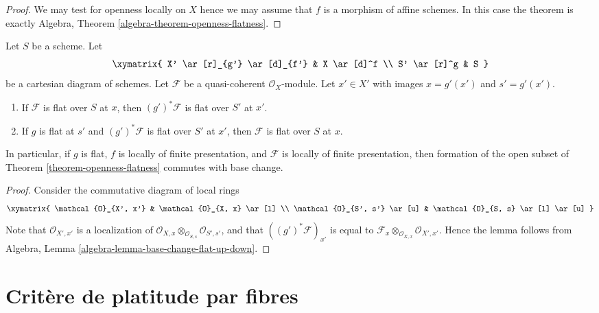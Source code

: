 \begin{proof}
We may test for openness locally on $X$ hence we may assume
that $f$ is a morphism of affine schemes. In this case the
theorem is exactly
Algebra, Theorem \ref{algebra-theorem-openness-flatness}.
\end{proof}

\begin{lemma}
\label{lemma-flat-locus-base-change}
Let $S$ be a scheme.
Let
$$
\xymatrix{
X' \ar[r]_{g'} \ar[d]_{f'} & X \ar[d]^f \\
S' \ar[r]^g & S
}
$$
be a cartesian diagram of schemes.
Let $\mathcal{F}$ be a quasi-coherent $\mathcal{O}_X$-module.
Let $x' \in X'$ with images
$x = g'(x')$ and $s' = g'(x')$.
\begin{enumerate}
\item If $\mathcal{F}$ is flat over $S$ at $x$, then
$(g')^*\mathcal{F}$ is flat over $S'$ at $x'$.
\item If $g$ is flat at $s'$ and $(g')^*\mathcal{F}$ is flat over $S'$ at
$x'$, then $\mathcal{F}$ is flat over $S$ at $x$.
\end{enumerate}
In particular, if $g$ is flat, $f$ is locally of finite presentation,
and $\mathcal{F}$ is locally of finite presentation,
then formation of the open subset of
Theorem \ref{theorem-openness-flatness}
commutes with base change.
\end{lemma}

\begin{proof}
Consider the commutative diagram of local rings
$$
\xymatrix{
\mathcal{O}_{X', x'} & \mathcal{O}_{X, x} \ar[l] \\
\mathcal{O}_{S', s'} \ar[u] & \mathcal{O}_{S, s} \ar[l] \ar[u]
}
$$
Note that $\mathcal{O}_{X', x'}$
is a localization of
$\mathcal{O}_{X, x} \otimes_{\mathcal{O}_{S, s}} \mathcal{O}_{S', s'}$,
and that $((g')^*\mathcal{F})_{x'}$ is equal to
$\mathcal{F}_x \otimes_{\mathcal{O}_{X, x}} \mathcal{O}_{X', x'}$.
Hence the lemma follows from
Algebra, Lemma \ref{algebra-lemma-base-change-flat-up-down}.
\end{proof}






\section{Crit\`ere de platitude par fibres}
\label{section-criterion-flat-fibres}

